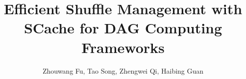 \documentclass[sigplan,10pt]{acmart}\settopmatter{printacmref=false}
\begin{document}
\title[]{Efficient Shuffle Management with SCache for DAG Computing Frameworks}         %



\author{Zhouwang Fu, Tao Song, Zhengwei Qi, Haibing Guan}





\end{document}

